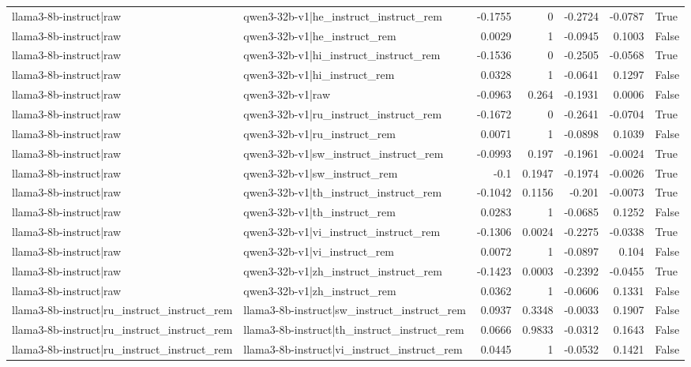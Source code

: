 \begin{table}
\begin{tabular}{l l r r r r l}
llama3-8b-instruct|raw & qwen3-32b-v1|he_instruct_instruct_rem & -0.1755 & 0 & -0.2724 & -0.0787 & True \\
llama3-8b-instruct|raw & qwen3-32b-v1|he_instruct_rem & 0.0029 & 1 & -0.0945 & 0.1003 & False \\
llama3-8b-instruct|raw & qwen3-32b-v1|hi_instruct_instruct_rem & -0.1536 & 0 & -0.2505 & -0.0568 & True \\
llama3-8b-instruct|raw & qwen3-32b-v1|hi_instruct_rem & 0.0328 & 1 & -0.0641 & 0.1297 & False \\
llama3-8b-instruct|raw & qwen3-32b-v1|raw & -0.0963 & 0.264 & -0.1931 & 0.0006 & False \\
llama3-8b-instruct|raw & qwen3-32b-v1|ru_instruct_instruct_rem & -0.1672 & 0 & -0.2641 & -0.0704 & True \\
llama3-8b-instruct|raw & qwen3-32b-v1|ru_instruct_rem & 0.0071 & 1 & -0.0898 & 0.1039 & False \\
llama3-8b-instruct|raw & qwen3-32b-v1|sw_instruct_instruct_rem & -0.0993 & 0.197 & -0.1961 & -0.0024 & True \\
llama3-8b-instruct|raw & qwen3-32b-v1|sw_instruct_rem & -0.1 & 0.1947 & -0.1974 & -0.0026 & True \\
llama3-8b-instruct|raw & qwen3-32b-v1|th_instruct_instruct_rem & -0.1042 & 0.1156 & -0.201 & -0.0073 & True \\
llama3-8b-instruct|raw & qwen3-32b-v1|th_instruct_rem & 0.0283 & 1 & -0.0685 & 0.1252 & False \\
llama3-8b-instruct|raw & qwen3-32b-v1|vi_instruct_instruct_rem & -0.1306 & 0.0024 & -0.2275 & -0.0338 & True \\
llama3-8b-instruct|raw & qwen3-32b-v1|vi_instruct_rem & 0.0072 & 1 & -0.0897 & 0.104 & False \\
llama3-8b-instruct|raw & qwen3-32b-v1|zh_instruct_instruct_rem & -0.1423 & 0.0003 & -0.2392 & -0.0455 & True \\
llama3-8b-instruct|raw & qwen3-32b-v1|zh_instruct_rem & 0.0362 & 1 & -0.0606 & 0.1331 & False \\
llama3-8b-instruct|ru_instruct_instruct_rem & llama3-8b-instruct|sw_instruct_instruct_rem & 0.0937 & 0.3348 & -0.0033 & 0.1907 & False \\
llama3-8b-instruct|ru_instruct_instruct_rem & llama3-8b-instruct|th_instruct_instruct_rem & 0.0666 & 0.9833 & -0.0312 & 0.1643 & False \\
llama3-8b-instruct|ru_instruct_instruct_rem & llama3-8b-instruct|vi_instruct_instruct_rem & 0.0445 & 1 & -0.0532 & 0.1421 & False \\

\end{tabular}
\end{table}
